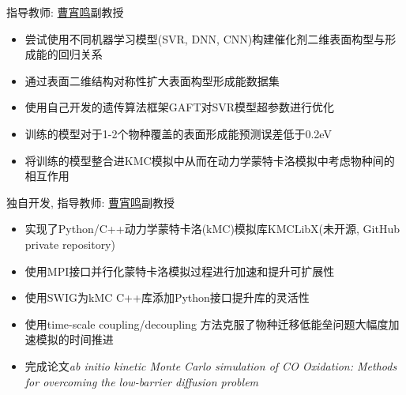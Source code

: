 \documentclass{resume}
\begin{document}
 {指导教师: \faLink \href{http://chem.ecust.edu.cn/2014/1211/c6655a50467/page.htm}{曹宵鸣}副教授}
\begin{onehalfspacing}
\begin{itemize}
    \item 尝试使用不同机器学习模型(SVR, DNN, CNN)构建催化剂二维表面构型与形成能的回归关系
    \item 通过表面二维结构对称性扩大表面构型形成能数据集
    \item 使用自己开发的遗传算法框架GAFT对SVR模型超参数进行优化
    \item 训练的模型对于1-2个物种覆盖的表面形成能预测误差低于0.2eV
    \item 将训练的模型整合进KMC模拟中从而在动力学蒙特卡洛模拟中考虑物种间的相互作用
\end{itemize}
\end{onehalfspacing}

 {独自开发, 指导教师: \faLink \href{http://chem.ecust.edu.cn/2014/1211/c6655a50467/page.htm}{曹宵鸣}副教授}
\begin{onehalfspacing}
\begin{itemize}
    \item 实现了Python/C++动力学蒙特卡洛(kMC)模拟库KMCLibX(未开源, GitHub private repository)
    \item 使用MPI接口并行化蒙特卡洛模拟过程进行加速和提升可扩展性
    \item 使用SWIG为kMC C++库添加Python接口提升库的灵活性
    \item 使用time-scale coupling/decoupling 方法克服了物种迁移低能垒问题大幅度加速模拟的时间推进
    \item 完成论文\emph{ab initio kinetic Monte Carlo simulation of CO Oxidation: Methods for overcoming the low-barrier diffusion problem}
\end{itemize}
\end{onehalfspacing}
\end{document}
